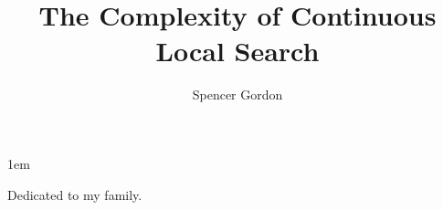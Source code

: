 \documentclass[tocnosub,noragright,centerchapter,12pt,mixcasechap]{uiucecethesis09}
\title{The Complexity of Continuous Local Search}
\author{Spencer Gordon}
\theoremstyle{plain}
\theoremstyle{definition}
\begin{document}
%
\maketitle

\parindent 1em%

\frontmatter

%
\begin{abstract}

\end{abstract}


%
\begin{dedication}
Dedicated to my family.
\end{dedication}

%
\begin{acknowledgments}
\end{acknowledgments}

%
\tableofcontents

%



%
\end{document}
